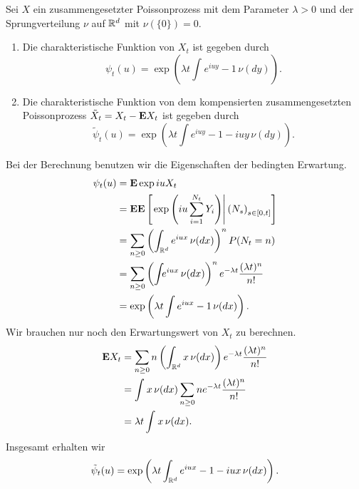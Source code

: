 Sei $X$ ein zusammengesetzter Poissonprozess mit dem Parameter $\lambda>0$ und
der Sprungverteilung $\nu$ auf $\mathbb R^d$ mit $\nu(\{0\})=0$. 
\begin{enumerate}
    \item Die charakteristische Funktion von $X_t$ ist gegeben durch
        \begin{equation*}
            \psi_t(u) = \exp \left( \lambda t \int_{}^{} e^{iuy}-1 \, \nu(dy) \right). 
        \end{equation*}
    \item Die charakteristische Funktion von dem kompensierten zusammengesetzten
        Poissonprozess $\tilde X_t = X_t - \mathbf{E} X_t$ ist gegeben durch
        \begin{equation*}
            \tilde \psi_t(u) = \exp \left( \lambda t \int e^{iuy}-1-iuy \, \nu(dy) \right). 
        \end{equation*}
\end{enumerate}

\solution Bei der Berechnung benutzen wir die Eigenschaften der bedingten
Erwartung.
\begin{align*}
    \psi_t (u) &= \mathbf{E} \exp iu X_t \\
    &= \mathbf{E} \mathbf{E} \left[ \left. \exp \left( iu \sum_{i=1}^{N_t} Y_i \right) \right| \left( N_s \right)_{s\in [0,t]} \right] \\
    &= \sum_{n \geq 0}^{} \left( \int_{\mathbb R^d} e^{iu x} \, \nu(dx) \right)^n P(N_t = n) \\
    &= \sum_{n \geq 0}^{} \left( \int_{} e^{iu x} \, \nu(dx) \right)^n
        e^{-\lambda t} \frac{(\lambda t)^n}{n!} \\
    &= \exp \left( \lambda t \int e^{iux}-1 \, \nu(dx) \right).
\end{align*}
Wir brauchen nur noch den Erwartungswert von $X_t$ zu berechnen. 
\begin{align*}
    \mathbf{E} X_t &= \sum_{n \geq 0}^{} n \left( \int_{\mathbb R^d} x\, \nu(dx) \right) 
    e^{-\lambda t} \frac{(\lambda t)^n}{n!} \\
    &= \int_{}^{} x \, \nu(dx) \sum_{n \geq 0} n e^{-\lambda t} \frac{(\lambda t)^n}{n!} \\
    &= \lambda t \int_{}^{} x \, \nu (dx). 
\end{align*}
Insgesamt erhalten wir 
\begin{equation*}
    \tilde \psi_t (u) = \exp \left( \lambda t \int_{\mathbb R^d} e^{iux}-1-iux \, \nu(dx) \right).
\end{equation*}





